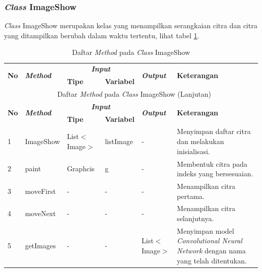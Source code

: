 \subsubsection{\textit{Class} ImageShow}
\noindent \textit{Class} ImageShow merupakan kelas yang menampilkan serangkaian citra dan citra yang ditampilkan berubah dalam waktu tertentu, lihat tabel \ref{tbl:classImageShow}.
\begingroup
\setlength{\LTleft}{-20cm plus -1fill}
\setlength{\LTright}{\LTleft}
\begin{small}
\begin{longtable}{|p{0.4cm}|p{2cm}|p{1.8cm}|p{1.8cm}|p{1.7cm}|p{3.55cm}|}
	\caption{Daftar \textit{Method} pada \textit{Class} ImageShow \label{tbl:classImageShow}}\\
	\hline
	\multirow{2}{*}{\textbf{No}} & \multirow{2}{*}{\textit{\textbf{Method}}} & \multicolumn{2}{c|}{\textit{\textbf{Input}}} & \multirow{2}{*}{\textit{\textbf{Output}}} & 
	\multirow{2}{*}{\textbf{Keterangan}}\\
	\cline{3-4}
	& & \textbf{Tipe} & \textbf{Variabel} & & \\
	\endfirsthead
	\multicolumn{6}{c}{\textbf{\tablename~\thetable} Daftar \textit{Method} pada \textit{Class} ImageShow (Lanjutan)} \\
	\hline
	\multirow{2}{*}{\textbf{No}} & \multirow{2}{*}{\textit{\textbf{Method}}} & \multicolumn{2}{c|}{\textit{\textbf{Input}}} & \multirow{2}{*}{\textit{\textbf{Output}}} & 
	\multirow{2}{*}{\textbf{Keterangan}}\\
	\cline{3-4}
	& & \textbf{Tipe} & \textbf{Variabel} & & \\
	\endhead
	\hline
	1 & ImageShow & List$<$\newline Image$>$ & listImage & - & Menyimpan daftar citra dan melakukan inisialisasi.\\
	\hline
	2 & paint & Graphcis & g & - & Membentuk citra pada indeks yang bersesuaian.\\
	\hline
	3 & moveFirst & - & - & - & Menampilkan citra pertama.\\
	\hline
	4 & moveNext & - & - & - & Menampilkan citra selanjutnya.\\
	\hline
	5 & getImages & - & - & List$<$\newline Image$>$ & Menyimpan model \textit{Convolutional Neural Network} dengan nama yang telah ditentukan.\\
	\hline
\end{longtable}
\end{small}
\endgroup

